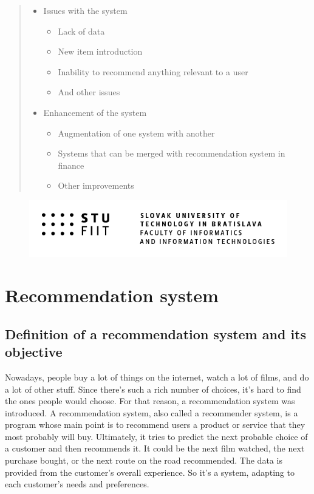 \documentclass[10pt,twoside,english,a4paper]{article}
\begin{document}
\begin{abstract}
\begin{itemize}
    \item Issues with the system
    \begin{itemize}
        \item Lack of data
        \item New item introduction
        \item Inability to recommend anything relevant to a user
        \item And other issues
    \end{itemize}
    
    \item Enhancement of the system
    \begin{itemize}
        \item Augmentation of one system with another
        \item Systems that can be merged with recommendation system in finance
        \item Other improvements
    \end{itemize}\cite{arch_rec_sys}
\end{itemize}


\end{abstract}
\newpage
\tableofcontents

\begin{figure}[h!]
    \centering
    \includegraphics[width=1\textwidth]{STU-FIIT-anch}
\end{figure}

\newpage






\section{Recommendation system}

\subsection{Definition of a recommendation system and its objective}
Nowadays, people buy a lot of things on the internet, watch a lot of films, and do a lot of other stuff. Since there's such a rich number of choices, it's hard to find the ones people would choose. For that reason, a recommendation system was introduced. A recommendation system, also called a recommender system, is a program whose main point is to recommend users a product or service that they most probably will buy. Ultimately, it tries to predict the next probable choice of a customer and then recommends it. It could be the next film watched, the next purchase bought, or the next route on the road recommended. The data is provided from the customer's overall experience. So it's a system, adapting to each customer's needs and preferences.\cite{vars_rec_sys}
\end{document}
